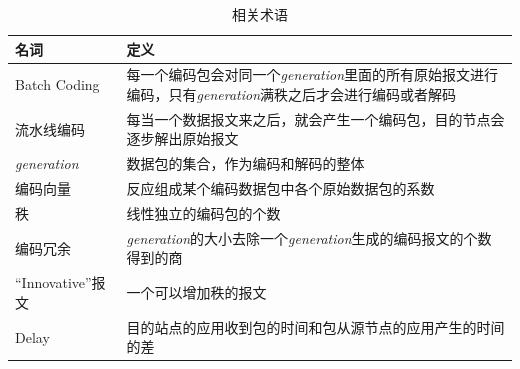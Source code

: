 \begin{table}[htbp]
	\centering
	\caption{相关术语}
	\begin{tabularx}{350pt}{l|X}
		\toprule
		\textbf{名词} & \textbf{定义}\\
		\midrule
		Batch Coding & 每一个编码包会对同一个\emph{generation}里面的所有原始报文进行编码，只有\emph{generation}满秩之后才会进行编码或者解码\\
		\hline
		流水线编码 & 每当一个数据报文来之后，就会产生一个编码包，目的节点会逐步解出原始报文\\
		\hline
		\emph{generation} & 数据包的集合，作为编码和解码的整体\\
		\hline
		编码向量 & 反应组成某个编码数据包中各个原始数据包的系数\\
		\hline
		秩 & 线性独立的编码包的个数\\
		\hline
		编码冗余 & \emph{generation}的大小去除一个\emph{generation}生成的编码报文的个数得到的商\\
		\hline
		“Innovative”报文 & 一个可以增加秩的报文 \\
		\hline
		Delay & 目的站点的应用收到包的时间和包从源节点的应用产生的时间的差\\
		\bottomrule
	\end{tabularx}
\label{XGSHUYU}
\end{table}
